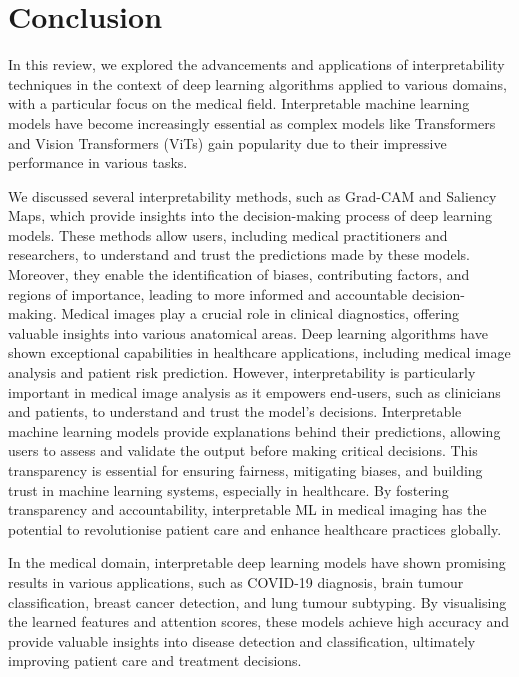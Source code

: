 \documentclass[dvipsnames]{article}
\begin{document}
\section{Conclusion}

In this review, we explored the advancements and applications of interpretability techniques in the context of deep learning algorithms applied to various domains, with a particular focus on the medical field. Interpretable machine learning models have become increasingly essential as complex models like Transformers and Vision Transformers (ViTs) gain popularity due to their impressive performance in various tasks.

We discussed several interpretability methods, such as Grad-CAM and Saliency Maps, which provide insights into the decision-making process of deep learning models. These methods allow users, including medical practitioners and researchers, to understand and trust the predictions made by these models. Moreover, they enable the identification of biases, contributing factors, and regions of importance, leading to more informed and accountable decision-making.
Medical images play a crucial role in clinical diagnostics, offering valuable insights into various anatomical areas. Deep learning algorithms have shown exceptional capabilities in healthcare applications, including medical image analysis and patient risk prediction. However, interpretability is particularly important in medical image analysis as it empowers end-users, such as clinicians and patients, to understand and trust the model's decisions. Interpretable machine learning models provide explanations behind their predictions, allowing users to assess and validate the output before making critical decisions. This transparency is essential for ensuring fairness, mitigating biases, and building trust in machine learning systems, especially in healthcare. By fostering transparency and accountability, interpretable ML in medical imaging has the potential to revolutionise patient care and enhance healthcare practices globally.

In the medical domain, interpretable deep learning models have shown promising results in various applications, such as COVID-19 diagnosis, brain tumour classification, breast cancer detection, and lung tumour subtyping. By visualising the learned features and attention scores, these models achieve high accuracy and provide valuable insights into disease detection and classification, ultimately improving patient care and treatment decisions.
\end{document}
